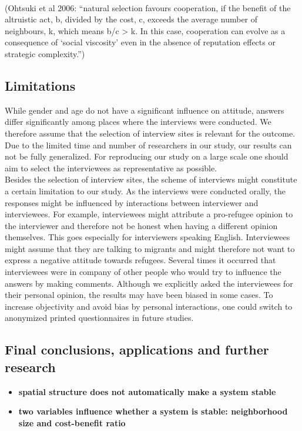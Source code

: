 \\
(Ohtsuki et al 2006:
 ``natural selection favours cooperation, if the
 benefit of the altruistic act, b, divided by the cost, c, exceeds the
 average number of neighbours, k, which means b/c > k. In this
 case, cooperation can evolve as a consequence of ‘social viscosity’
 even in the absence of reputation effects or strategic complexity.'')
 

\subsection{Limitations}
While gender and age do not have a significant influence on attitude, answers differ significantly among places where the interviews were conducted. We therefore assume that the selection of interview sites is relevant for the outcome. Due to the limited time and number of researchers in our study, our results can not be fully generalized. For reproducing our study on a large scale one should aim to select the interviewees as representative as possible.\\
Besides the selection of interview sites, the scheme of interviews might constitute a certain limitation to our study. As the interviews were conducted orally, the responses might be influenced by interactions between interviewer and interviewees. For example, interviewees might attribute a pro-refugee opinion to the interviewer and therefore not be honest when having a different opinion themselves. This goes especially for interviewers speaking English. Interviewees might assume that they are talking to migrants and might therefore not want to express a negative attitude towards refugees. Several times it occurred that interviewees were in company of other people who would try to influence the answers by making comments. Although we explicitly asked the interviewees for their personal opinion, the results may have been biased in some cases. To increase objectivity and avoid bias by personal interactions, one could switch to anonymized printed questionnaires in future studies.\\

\subsection{Final conclusions, applications and further research}

\begin{itemize}
	\item{\textbf{spatial structure does not automatically make a system stable}}\\
	\item{\textbf{two variables influence whether a system is stable: neighborhood size and cost-benefit ratio}}
\end{itemize}


